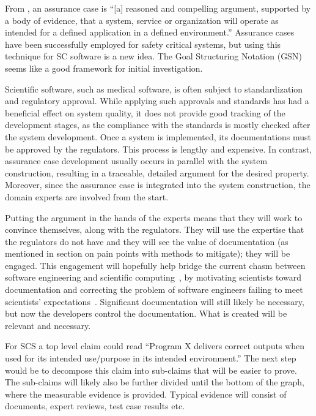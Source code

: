 \documentclass[final, 3p, times, authoryear]{elsarticle}
\begin{document}
From \cite{RinehartEtAl2015}, an assurance case is ``[a] reasoned and compelling
argument, supported by a body of evidence, that a system, service or
organization will operate as intended for a defined application in a defined
environment.''  Assurance cases have been successfully employed for safety
critical systems, but using this technique for SC software is a new idea.  The
Goal Structuring Notation (GSN) \cite{Spriggs2012} seems like a good framework
for initial investigation.

Scientific software, such as medical software, is often subject to
standardization and regulatory approval. While applying such approvals and
standards has had a beneficial effect on system quality, it does not provide
good tracking of the development stages, as the compliance with the standards
is mostly checked after the system development. Once a system is implemented,
its documentations must be approved by the regulators. This process is lengthy
and expensive. In contrast, assurance case development usually occurs in
parallel with the system construction, resulting in a traceable, detailed
argument for the desired property.  Moreover, since the assurance case is
integrated into the system construction, the domain experts are involved from
the start.

Putting the argument in the hands of the experts means that they will work to
convince themselves, along with the regulators.  They will use the expertise
that the regulators do not have and they will see the value of documentation (as
mentioned in section on pain points with methods to mitigate); they will be
engaged.  This engagement will hopefully help bridge the current chasm between
software engineering and scientific computing~\cite{Kelly2007}, by motivating
scientists toward documentation and correcting the problem of software engineers
failing to meet scientists' expectations~\cite{Segal2008}.  Significant
documentation will still likely be necessary, but now the developers control the
documentation.  What is created will be relevant and necessary.

For SCS a top level claim could read ``Program X delivers correct outputs when
used for its intended use/purpose in its intended environment.''  The next step
would be to decompose this claim into sub-claims that will be easier to prove.
The sub-claims will likely also be further divided until the bottom of the
graph, where the measurable evidence is provided.  Typical evidence will consist
of documents, expert reviews, test case results etc.
\end{document}
